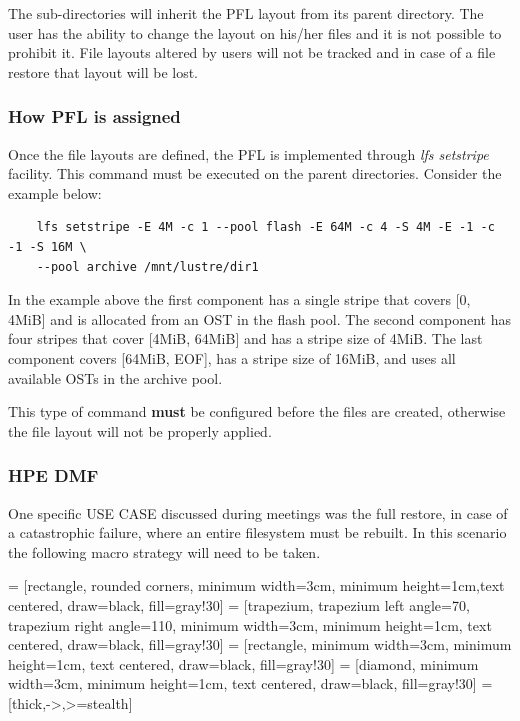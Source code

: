 \documentclass{article}
\begin{document}
The sub-directories will inherit the PFL layout from its parent directory. The user has the ability to change the layout on his/her files and it is not possible to prohibit it. File layouts altered by users will not be tracked and in case of a file restore that layout will be lost.

\subsubsection{How PFL is assigned}
Once the file layouts are defined, the PFL is implemented through \textit{lfs setstripe} facility. This command must be executed on the parent directories. Consider the example below:
\begin{verbatim}
    lfs setstripe -E 4M -c 1 --pool flash -E 64M -c 4 -S 4M -E -1 -c -1 -S 16M \ 
    --pool archive /mnt/lustre/dir1
\end{verbatim}

In the example above the first component has a single stripe that covers [0, 4MiB] and is allocated from an OST in the flash pool. The second component has four stripes that cover [4MiB, 64MiB] and has a stripe size of 4MiB. The last component covers [64MiB, EOF], has a stripe size of 16MiB, and uses all available OSTs in the archive pool.

This type of command \textbf{must} be configured before the files are created, otherwise the file layout will not be properly applied.

\subsubsection{HPE DMF}
One specific USE CASE discussed during meetings was the full restore, in case of a catastrophic failure, where an entire filesystem must be rebuilt. In this scenario the following macro strategy will need to be taken.

 = [rectangle, rounded corners, minimum width=3cm, minimum height=1cm,text centered, draw=black, fill=gray!30]
\tikzstyle{io} = [trapezium, trapezium left angle=70, trapezium right angle=110, minimum width=3cm, minimum height=1cm, text centered, draw=black, fill=gray!30]
\tikzstyle{process} = [rectangle, minimum width=3cm, minimum height=1cm, text centered, draw=black, fill=gray!30]
\tikzstyle{decision} = [diamond, minimum width=3cm, minimum height=1cm, text centered, draw=black, fill=gray!30]
\tikzstyle{arrow} = [thick,->,>=stealth]
\end{document}

